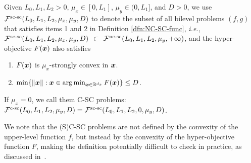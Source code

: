 \documentclass{article}
\begin{document}

\begin{dfn} \label{dfn:SC-SC-func}
Given
$L_0,L_1, L_2>0$, $\mu_x \in [0,L_1]$, $\mu_y \in (0,L_1]$, and $D>0$, we use ${\mathcal{F}}^{\text{sc-sc}}(L_0,L_1,L_2,\mu_x,\mu_y, D)$ to denote the subset of all bilevel problems $(f,g)$ 
that satisfies items 1 and 2 in Definition \ref{dfn:NC-SC-func}, \textit{i.e.}, 
${\mathcal{F}}^{\text{sc-sc}}(L_0,L_1,L_2,\mu_x,\mu_y, D)$ $ \subset $ ${\mathcal{F}}^{\text{nc-sc}} (L_0,L_1,L_2, \mu_y, +\infty )$, and the hyper-objective
$F({\bm{x}})$ also satisfies
\begin{enumerate}
    \item $F({\bm{x}})$ is $\mu_x$-strongly convex in ${\bm{x}}$. 
    \item $\min\{ \Vert {\bm{x}} \Vert : {\bm{x}} \in  \arg \min_{{\bm{x}} \in {\mathbb{R}}^{d_x}} F({\bm{x}})  \} \le D$.
\end{enumerate}
If $\mu_x = 0$, we call them C-SC problems: ${\mathcal{F}}^{\text{c-sc}}(L_0,L_1,L_2,\mu_y, D) = {\mathcal{F}}^{\text{sc-sc}}(L_0,L_1,L_2,0,\mu_y, D)$.
\end{dfn}

{  We note that the (S)C-SC problems are not defined by the convexity of the upper-level function $f$, but instead by the convexity of the hyper-objective function $F$, making the definition potentially difficult to check in practice, as discussed in~\citep{hong2023two}. }

\end{document}
